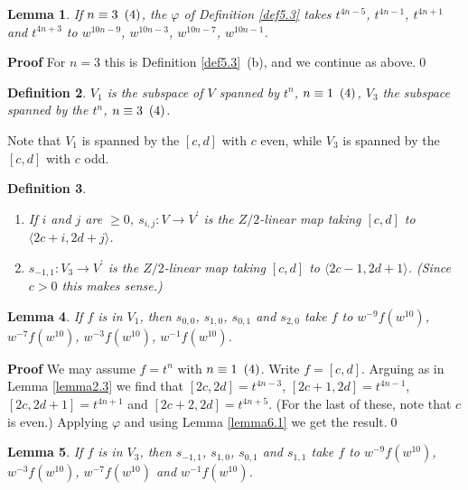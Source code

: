 \documentclass{monsky2009}
\newenvironment{proof}[1][]{\textbf{Proof #1\hspace{.3em}}}{}
\newtheorem{definition}{Definition}[section]
\newtheorem{lemma}[definition]{Lemma}
\newcommand{\mod}[1]{\ensuremath{\hspace{.5em}(#1)}}
\begin{document}
\begin{lemma}%
\label{lemma6.2}
If $n\equiv 3\mod{4}$, the $\varphi$ of Definition \ref{def5.3} takes $t^{4n-5}$, $t^{4n-1}$, $t^{4n+1}$ and $t^{4n+3}$ to $w^{10n-9}$, $w^{10n-3}$, $w^{10n-7}$, $w^{10n-1}$.
\end{lemma}

\begin{proof}
For $n=3$ this is Definition \ref{def5.3}~(b), and we continue as above.\qed
\end{proof}

\begin{definition}
\label{def6.3}
$V_{1}$ is the subspace of $V$ spanned by $t^{n}$, $n\equiv 1\mod{4}$, $V_{3}$ the subspace spanned by the $t^{n}$, $n\equiv 3\mod{4}$.
\end{definition}

Note that $V_{1}$ is spanned by the $[c,d]$ with $c$ even, while $V_{3}$ is spanned by the $[c,d]$ with $c$ odd.

\begin{definition}
\label{def6.4} \hspace{2em} %
\begin{enumerate}
\item[(1)] If $i$ and $j$ are $\ge 0$, $s_{i,j}:V\rightarrow V^{\prime}$ is the $Z/2$-linear map taking $[c,d]$ to $\langle 2c+i,2d+j\rangle$.
\item[(2)] $s_{-1,1}:V_{3}\rightarrow V^{\prime}$ is the $Z/2$-linear map taking $[c,d]$ to $\langle 2c-1,2d+1\rangle $. (Since $c>0$ this makes sense.)
\end{enumerate}
\end{definition}

\begin{lemma}%
\label{lemma6.5}
If $f$ is in $V_{1}$, then $s_{0,0}$, $s_{1,0}$, $s_{0,1}$ and $s_{2,0}$ take $f$ to $w^{-9}f(w^{10})$, $w^{-7}f(w^{10})$, $w^{-3}f(w^{10})$, $w^{-1}f(w^{10})$.
\end{lemma}

\begin{proof}
We may assume $f=t^{n}$ with $n\equiv 1\mod{4}$. Write $f=[c,d]$. Arguing as in Lemma \ref{lemma2.3} we find that $[2c,2d]=t^{4n-3}$, $[2c+1,2d]=t^{4n-1}$, $[2c,2d+1]=t^{4n+1}$ and $[2c+2,2d]=t^{4n+5}$. (For the last of these, note that $c$ is even.)  Applying $\varphi$ and using Lemma \ref{lemma6.1} we get the result.\qed
\end{proof}

\begin{lemma}%
\label{lemma6.6}
If $f$ is in $V_{3}$, then $s_{-1,1}$, $s_{1,0}$, $s_{0,1}$ and $s_{1,1}$ take $f$ to $w^{-9}f(w^{10})$, $w^{-3}f(w^{10})$, $w^{-7}f(w^{10})$ and $w^{-1}f(w^{10})$.
\end{lemma}
\end{document}
